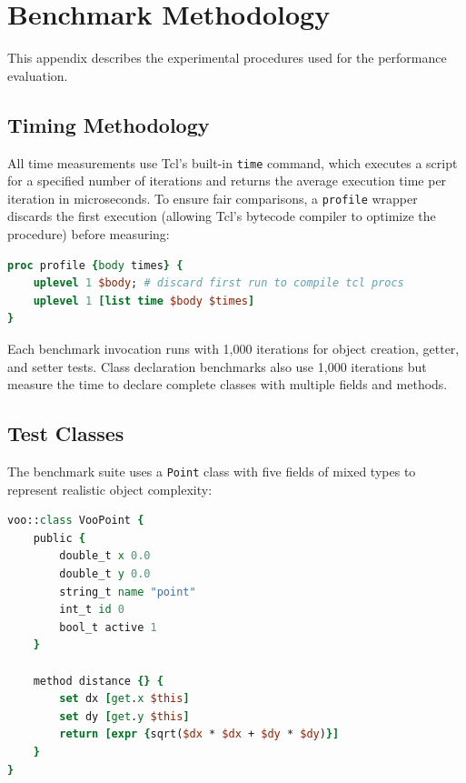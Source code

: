 \section{Benchmark Methodology}
\label{app:benchmark}

This appendix describes the experimental procedures used for the performance evaluation.

\subsection*{Timing Methodology}

All time measurements use Tcl's built-in \texttt{time} command, which executes a script
for a specified number of iterations and returns the average execution time per iteration
in microseconds. To ensure fair comparisons, a \texttt{profile} wrapper discards the first
execution (allowing Tcl's bytecode compiler to optimize the procedure) before measuring:

\begin{lstlisting}[language=Tcl, caption={Timing wrapper discarding the first run}]
proc profile {body times} {
    uplevel 1 $body; # discard first run to compile tcl procs
    uplevel 1 [list time $body $times]
}
\end{lstlisting}

Each benchmark invocation runs with 1,000 iterations for object creation, getter, and
setter tests. Class declaration benchmarks also use 1,000 iterations but measure the time
to declare complete classes with multiple fields and methods.

\subsection*{Test Classes}

The benchmark suite uses a \texttt{Point} class with five fields of mixed types to
represent realistic object complexity:

\begin{lstlisting}[language=Tcl, caption={VOO \texttt{Point} implementation}]
voo::class VooPoint {
    public {
        double_t x 0.0
        double_t y 0.0
        string_t name "point"
        int_t id 0
        bool_t active 1
    }

    method distance {} {
        set dx [get.x $this]
        set dy [get.y $this]
        return [expr {sqrt($dx * $dx + $dy * $dy)}]
    }
}
\end{lstlisting}

